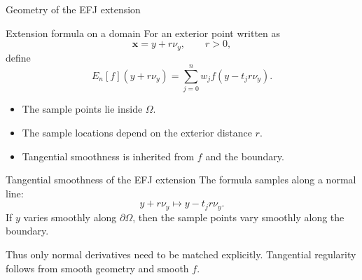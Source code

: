 \documentclass[aspectratio=169,11pt]{beamer}
\newcommand{\x}{\bm{x}}
\begin{document}
\begin{frame}{Geometry of the EFJ extension}
\begin{center}
\end{center}
\end{frame}

\begin{frame}{Extension formula on a domain}
\small
For an exterior point written as
\[
  \x=y+r\nu_y,\qquad r>0,
\]
define
\[
  E_n[f](y+r\nu_y)
  =
  \sum_{j=0}^n w_j f(y-t_jr\nu_y).
\]

\begin{itemize}
  \item The sample points lie inside $\Omega$.
  \item The sample locations depend on the exterior distance $r$.
  \item Tangential smoothness is inherited from $f$ and the boundary.
\end{itemize}
\end{frame}

\begin{frame}{Tangential smoothness of the EFJ extension}
\small
The formula samples along a normal line:
\[
  y+r\nu_y
  \mapsto
  y-t_jr\nu_y.
\]
If $y$ varies smoothly along $\partial\Omega$, then the sample points vary smoothly along the boundary.

\vspace{2mm}
Thus only normal derivatives need to be matched explicitly. Tangential regularity follows from smooth geometry and smooth $f$.
\end{frame}
\end{document}
